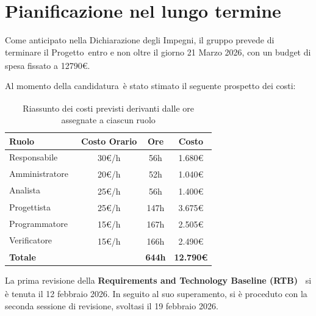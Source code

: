 \documentclass[a4paper,12pt]{article}
\newcommand{\pediceG}{\texorpdfstring{\textsubscript{\scalebox{0.6}{\textbf{G}}}~}{G}}
\begin{document}
\newpage

\section{Pianificazione nel lungo termine}

Come anticipato nella Dichiarazione degli Impegni, il gruppo prevede di terminare il Progetto\pediceG entro e non oltre il giorno 21 Marzo 2026, con un budget di spesa fissato a 12790€.

Al momento della candidatura\pediceG è stato stimato il seguente prospetto dei costi:

\begin{table}[H]
\centering
\begin{tabular}{|l|c|c|c|}
\hline
\textbf{Ruolo} & \textbf{Costo Orario} & \textbf{Ore} & \textbf{Costo} \\
\hline
Responsabile\pediceG & 30€/h & 56h & 1.680€ \\
\hline
Amministratore\pediceG & 20€/h & 52h & 1.040€ \\
\hline
Analista\pediceG & 25€/h & 56h & 1.400€ \\
\hline
Progettista\pediceG & 25€/h & 147h & 3.675€ \\
\hline
Programmatore\pediceG & 15€/h & 167h & 2.505€ \\
\hline
Verificatore\pediceG & 15€/h & 166h & 2.490€ \\
\hline
\textbf{Totale} & & \textbf{644h} & \textbf{12.790€} \\
\hline
\end{tabular}
\caption{Riassunto dei costi previsti derivanti dalle ore assegnate a ciascun ruolo}
\label{tab:costi-previsti}
\end{table}

La prima revisione della \textbf{Requirements and Technology Baseline (RTB)\pediceG} si è tenuta il 12 febbraio 2026. In seguito al suo superamento, si è proceduto con la seconda sessione di revisione, svoltasi il 19 febbraio 2026.
\end{document}
